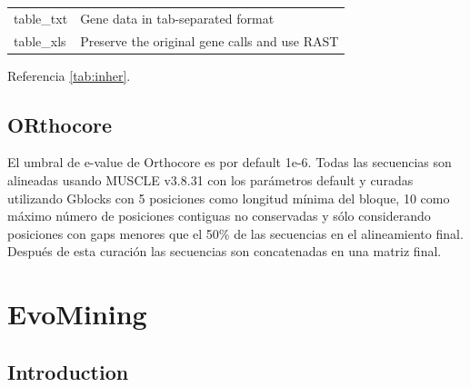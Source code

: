 \documentclass[12pt,twoside]{reedthesis}
\begin{document}
\begin{longtable}[]{@{}ll@{}}
  \begin{minipage}[t]{0.22\columnwidth}\raggedright\strut
  table\_txt\strut
  \end{minipage} & \begin{minipage}[t]{0.72\columnwidth}\raggedright\strut
  Gene data in tab-separated format\strut
  \end{minipage}\tabularnewline
  \begin{minipage}[t]{0.22\columnwidth}\raggedright\strut
  table\_xls\strut
  \end{minipage} & \begin{minipage}[t]{0.72\columnwidth}\raggedright\strut
  Preserve the original gene calls and use RAST\strut
  \end{minipage}\tabularnewline
  \bottomrule
  \end{longtable}
  
  Referencia \autoref{tab:inher}.
  
  \section{ORthocore}\label{orthocore}
  
  El umbral de e-value de Orthocore es por default 1e-6. Todas las
  secuencias son alineadas usando MUSCLE v3.8.31 con los parámetros
  default y curadas utilizando Gblocks con 5 posiciones como longitud
  mínima del bloque, 10 como máximo número de posiciones contiguas no
  conservadas y sólo considerando posiciones con gaps menores que el 50\%
  de las secuencias en el alineamiento final. Después de esta curación las
  secuencias son concatenadas en una matriz final.
  
  \chapter{EvoMining}\label{evomining}
  
  \section{Introduction}\label{introduction}
  
\end{document}
